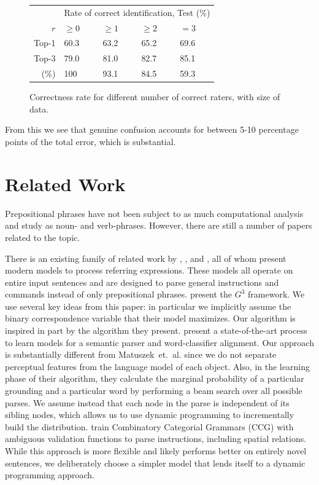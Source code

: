 \documentclass[conference]{IEEEtran}
\numberwithin{equation}{section}
\begin{document}
\begin{figure}[h!tb]
  \centering
  \begin{tabular}{|r|m{1.2cm}m{1.2cm}m{1.2cm}m{1.2cm}|}\hline
  & \multicolumn{4}{c|}{Rate of correct identification, Test (\%)} \\
  $r$ & $\geq 0$ & $\geq 1$ & $\geq 2$ & $=3$ \\\hline
  Top-1 & 60.3 & 63.2 & 65.2 & 69.6 \\
  Top-3 & 79.0 & 81.0 & 82.7 & 85.1 \\\hline
  (\%) & 100 & 93.1 & 84.5 & 59.3 \\\hline
  \end{tabular}
  \caption{Correctness rate for different number of correct raters, with size of data.}
  \label{fig:interrater}
\end{figure}

From this we see that genuine confusion accounts for between 5-10 percentage points of the total error, which is substantial.

\section{Related Work}

Prepositional phrases have not been subject to as much computational analysis and study as noun- and verb-phrases. However, there are still a number of papers related to the topic. 

There is an existing family of related work by \citet{tellex2011understanding}, \citet{UW_RSE_ICML2012}, and \citet{artzi2013weakly}, all of whom present modern models to process referring expressions. These models all operate on entire input sentences and are designed to parse general instructions and commands instead of only prepositional phrases. 
\citet{tellex2011understanding} present the $G^3$ framework. We use several key ideas from this paper: in particular we implicitly assume the binary correspondence variable that their model maximizes. Our algorithm is inspired in part by the algorithm they present.
\citet{UW_RSE_ICML2012} present a state-of-the-art process to learn models for a semantic parser and word-classifier alignment. Our approach is substantially different from Matuszek~et.~al. since we do not separate perceptual features from the language model of each object. Also, in the learning phase of their algorithm, they calculate the marginal probability of a particular grounding and a particular word by performing a beam search over all possible parses. We assume instead that each node in the parse is independent of its sibling nodes, which allows us to use dynamic programming to incrementally build the distribution.
\citet{artzi2013weakly} train Combinatory Categorial Grammars (CCG) with ambiguous validation functions to parse instructions, including spatial relations. While this approach is more flexible and likely performs better on entirely novel sentences, we deliberately choose a simpler model that lends itself to a dynamic programming approach.
\end{document}

